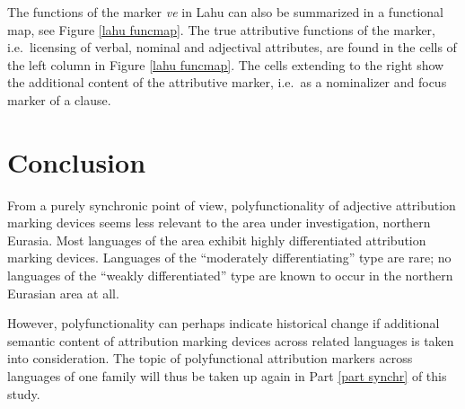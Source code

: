 The functions of the marker \textit{ve} in Lahu can also be summarized in a functional map, see Figure \ref{lahu funcmap}. The true attributive functions of the marker, i.e.~licensing of verbal, nominal and adjectival attributes, are found in the cells of the left column in Figure \ref{lahu funcmap}. The cells extending to the right show the additional content of the attributive marker, i.e.~as a nominalizer and focus marker of a clause.

\section{Conclusion}
From a purely synchronic point of view, polyfunctionality of adjective attribution marking devices seems less relevant to the area under investigation, northern Eurasia. Most languages of the area exhibit highly differentiated attribution marking devices. Languages of the “moderately differentiating” type are rare; no languages of the “weakly differentiated” type are known to occur in the northern Eurasian area at all.

However, polyfunctionality can perhaps indicate historical change if additional semantic content of attribution marking devices across related languages is taken into consideration. The topic of polyfunctional attribution markers across languages of one family will thus be taken up again in Part \ref{part synchr} of this study.
